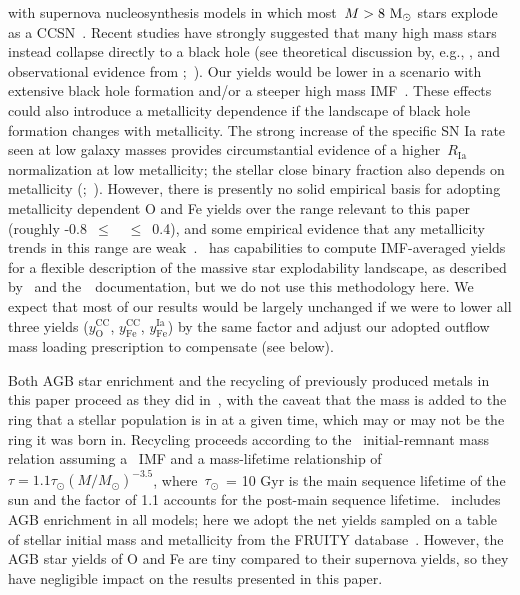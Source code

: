 \documentclass[draft2.tex]{subfiles}
\begin{document}
with supernova nucleosynthesis models in which most~$M > 8~\text{M}_\odot$ stars explode 
as a CCSN~\citep[e.g.][]{Chieffi2004, Chieffi2013}. 
Recent studies have strongly suggested that many high mass stars instead 
collapse directly to a black hole (see theoretical discussion by, e.g., 
\citealp{Pejcha2015, Sukhbold2016, Ertl2016}, and observational evidence from 
\citealp*{Gerke2015};~\citealp{Adams2017, Basinger2020}). 
Our yields would be lower in a scenario with extensive black hole formation 
and/or a steeper high mass IMF~\citep{Griffith2021b}. 
These effects could also introduce a metallicity dependence if the landscape of 
black hole formation changes with metallicity. 
The strong increase of the specific SN Ia rate seen at low galaxy masses 
\citep{Brown2019} provides circumstantial evidence of a higher~$R_\text{Ia}$ 
normalization at low metallicity; the stellar close binary fraction also 
depends on metallicity (\citealp{Badenes2018};~\citealp*{Moe2019}). 
However, there is presently no solid empirical basis for adopting metallicity 
dependent O and Fe yields over the range relevant to this paper (roughly 
-0.8~$\leq$~\feh~$\leq$~0.4), and some empirical evidence that any metallicity 
trends in this range are weak~\citep{Weinberg2019}. 
\vice~has capabilities to compute IMF-averaged yields for a flexible 
description of the massive star explodability landscape, as described 
by~\citet{Griffith2021b} and the~\vice~documentation, but we do not use this 
methodology here. 
We expect that most of our results would be largely unchanged if we were to 
lower all three yields ($y_\text{O}^\text{CC}$, $y_\text{Fe}^\text{CC}$, 
$y_\text{Fe}^\text{Ia}$) by the same factor and adjust our adopted outflow 
mass loading prescription to compensate (see below). 
\par 
Both AGB star enrichment and the recycling of previously produced metals in 
this paper proceed as they did in~\citet{Johnson2020}, with the caveat that the 
mass is added to the ring that a stellar population is in at a given time, 
which may or may not be the ring it was born in. 
Recycling proceeds according to the~\citet{Kalirai2008} initial-remnant mass 
relation assuming a~\citet{Kroupa2001} IMF and a mass-lifetime relationship of 
$\tau = 1.1\tau_\odot(M/M_\odot)^{-3.5}$, where~$\tau_\odot$~= 10 Gyr is the 
main sequence lifetime of the sun and the factor of 1.1 accounts for the 
post-main sequence lifetime. 
\vice~includes AGB enrichment in all models; here we adopt the net yields 
sampled on a table of stellar initial mass and metallicity from the FRUITY 
database~\citep{Cristallo2011, Cristallo2015}. 
However, the AGB star yields of O and Fe are tiny compared to their 
supernova yields, so they have negligible impact on the results presented in 
this paper. 
\end{document}
